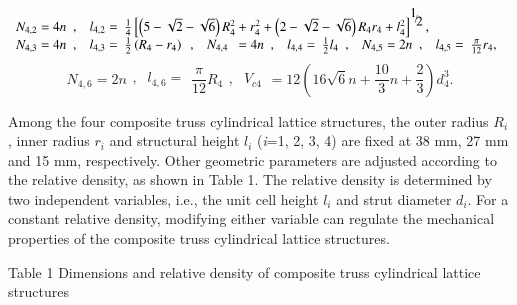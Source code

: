 \documentclass{article} %
\begin{document}
\[\begin{array}{l} {N_{4,2} =4n\begin{array}{cc} {,} & {l_{4,2} =} \end{array}\frac{1}{4} \left[\left(5-\sqrt{2} -\sqrt{6} \right)R_{4}^{2} +r_{4}^{2} +\left(2-\sqrt{2} -\sqrt{6} \right)R_{4} r_{4} +l_{4}^{2} \right]^{{\raise0.7ex\hbox{$ 1 $}\!\mathord{\left/{\vphantom{1 2}}\right.\kern-\nulldelimiterspace}\!\lower0.7ex\hbox{$ 2 $}} } ,} \\ {N_{4,3} =4n\begin{array}{cc} {,} & {l_{4,3} =} \end{array}\frac{1}{2} \left(R_{4} -r_{4} \right)\begin{array}{cc} {,} & {N_{4,4} } \end{array}=4n\begin{array}{cc} {,} & {l_{4,4} =} \end{array}\frac{1}{2} l_{4} \begin{array}{cc} {,} & {N_{4,5} =2n\begin{array}{cc} {,} & {l_{4,5} =} \end{array}\frac{\pi }{12} r_{4} ,} \end{array}} \end{array}\] 
\[N_{4,6} =2n\begin{array}{cc} {,} & {l_{4,6} =} \end{array}\frac{\pi }{12} R_{4} \begin{array}{cc} {,} & {V_{c4} } \end{array}=12\left(16\sqrt{6} n+\frac{10}{3} n+\frac{2}{3} \right)d_{4}^{3} .\] 

Among the four composite truss cylindrical lattice structures, the outer radius $R_{i} $ , inner radius $r_{i} $ and structural height $l_{i} $ (\textit{i}=1, 2, 3, 4) are fixed at 38 mm, 27 mm and 15 mm, respectively. Other geometric parameters are adjusted according to the relative density, as shown in Table 1. The relative density is determined by two independent variables, i.e., the unit cell height $l_{i} $ and strut diameter $d_{i} $. For a constant relative density, modifying either variable can regulate the mechanical properties of the composite truss cylindrical lattice structures.

Table 1  Dimensions and relative density of composite truss cylindrical lattice structures
\end{document}
